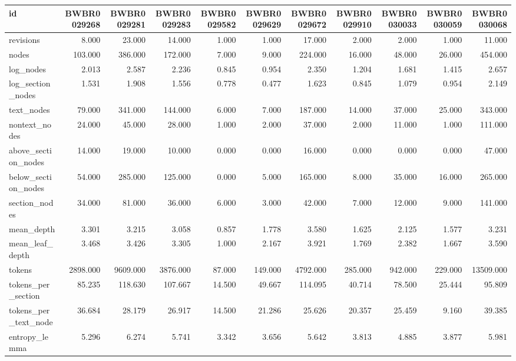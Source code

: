 \begin{tabular}{lrrrrrrrrrr}
\toprule
id & BWBR0029268 & BWBR0029281 & BWBR0029283 & BWBR0029582 & BWBR0029629 & BWBR0029672 & BWBR0029910 & BWBR0030033 & BWBR0030059 & BWBR0030068 \\
\midrule
revisions & 8.000 & 23.000 & 14.000 & 1.000 & 1.000 & 17.000 & 2.000 & 2.000 & 1.000 & 11.000 \\
\cline{1-11}
nodes & 103.000 & 386.000 & 172.000 & 7.000 & 9.000 & 224.000 & 16.000 & 48.000 & 26.000 & 454.000 \\
\cline{1-11}
log\_nodes & 2.013 & 2.587 & 2.236 & 0.845 & 0.954 & 2.350 & 1.204 & 1.681 & 1.415 & 2.657 \\
\cline{1-11}
log\_section\_nodes & 1.531 & 1.908 & 1.556 & 0.778 & 0.477 & 1.623 & 0.845 & 1.079 & 0.954 & 2.149 \\
\cline{1-11}
text\_nodes & 79.000 & 341.000 & 144.000 & 6.000 & 7.000 & 187.000 & 14.000 & 37.000 & 25.000 & 343.000 \\
\cline{1-11}
nontext\_nodes & 24.000 & 45.000 & 28.000 & 1.000 & 2.000 & 37.000 & 2.000 & 11.000 & 1.000 & 111.000 \\
\cline{1-11}
above\_section\_nodes & 14.000 & 19.000 & 10.000 & 0.000 & 0.000 & 16.000 & 0.000 & 0.000 & 0.000 & 47.000 \\
\cline{1-11}
below\_section\_nodes & 54.000 & 285.000 & 125.000 & 0.000 & 5.000 & 165.000 & 8.000 & 35.000 & 16.000 & 265.000 \\
\cline{1-11}
section\_nodes & 34.000 & 81.000 & 36.000 & 6.000 & 3.000 & 42.000 & 7.000 & 12.000 & 9.000 & 141.000 \\
\cline{1-11}
mean\_depth & 3.301 & 3.215 & 3.058 & 0.857 & 1.778 & 3.580 & 1.625 & 2.125 & 1.577 & 3.231 \\
\cline{1-11}
mean\_leaf\_depth & 3.468 & 3.426 & 3.305 & 1.000 & 2.167 & 3.921 & 1.769 & 2.382 & 1.667 & 3.590 \\
\cline{1-11}
tokens & 2898.000 & 9609.000 & 3876.000 & 87.000 & 149.000 & 4792.000 & 285.000 & 942.000 & 229.000 & 13509.000 \\
\cline{1-11}
tokens\_per\_section & 85.235 & 118.630 & 107.667 & 14.500 & 49.667 & 114.095 & 40.714 & 78.500 & 25.444 & 95.809 \\
\cline{1-11}
tokens\_per\_text\_node & 36.684 & 28.179 & 26.917 & 14.500 & 21.286 & 25.626 & 20.357 & 25.459 & 9.160 & 39.385 \\
\cline{1-11}
entropy\_lemma & 5.296 & 6.274 & 5.741 & 3.342 & 3.656 & 5.642 & 3.813 & 4.885 & 3.877 & 5.981 \\

\end{tabular}
